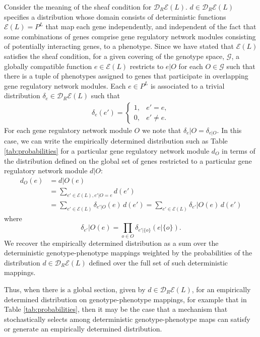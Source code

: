Consider the meaning of the sheaf condition for $\mathcal{D}_R\mathcal{E}(L)$. $d \in \mathcal{D}_R\mathcal{E}(L)$ specifies a distribution whose domain consists of deterministic functions $\mathcal{E}(L) = P^L$ that map each gene independently, and independent of the fact that some combinations of genes  comprise gene regulatory network modules consisting of potentially interacting genes, to a phenotype. Since we have stated that $\mathcal{E}(L)$ satisfies the sheaf condition, for a given covering of the genotype space, $\mathcal{G}$, a globally compatible function $e \in  \mathcal{E}(L)$ restricts to $e|O$ for each $O \in \mathcal{G}$ such that there is a tuple of phenotypes assigned to genes that participate in overlapping gene regulatory network modules. Each $e \in P^L$ is associated to a trivial distribution $\delta_e \in \mathcal{D}_R\mathcal{E}(L)$ such that
\begin{eqnarray}
\delta_e(e') =
\begin{cases}
1, & e' = e,\\
0, & e' \neq e.
\end{cases}
\end{eqnarray}
For each gene regulatory network module $O$ we note that $\delta_e|O = \delta_{e|O}$. In this case, we can write the empirically determined distribution such as Table \ref{tab:probabilities} for a particular gene regulatory network module $d_O$ in terms of the distribution defined on the global set of genes restricted to a particular gene regulatory network module $d|O$:
\begin{equation}\label{eq:factordist}
\begin{split}
d_O(e) &= d|O(e)\\
&= \sum_{e' \in \mathcal{E}(L),e'|O=e} d(e')\\
&= \sum_{e' \in \mathcal{E}(L)} \delta_{e'|O}(e) \, d(e') = \sum_{e' \in \mathcal{E}(L)} \delta_{e'}|O(e) \, d(e')
\end{split}
\end{equation}
where
\begin{equation*}
\delta_{e'}|O(e) = \prod_{o \in O} \delta_{e'|\{o\}}(e|\{o\}).
\end{equation*}
We recover the empirically determined distribution as a sum over the deterministic genotype-phenotype mappings weighted by the probabilities of the distribution $d \in \mathcal{D}_R\mathcal{E}(L)$ defined over the full set of such deterministic mappings.

Thus, when there is a global section, given by $d \in \mathcal{D}_R\mathcal{E}(L)$, for an empirically determined distribution on genotype-phenotype mappings, for example that in Table \ref{tab:probabilities}, then it may be the case that a mechanism that stochastically selects among deterministic genotype-phenotype maps can satisfy or generate an empirically determined distribution.

